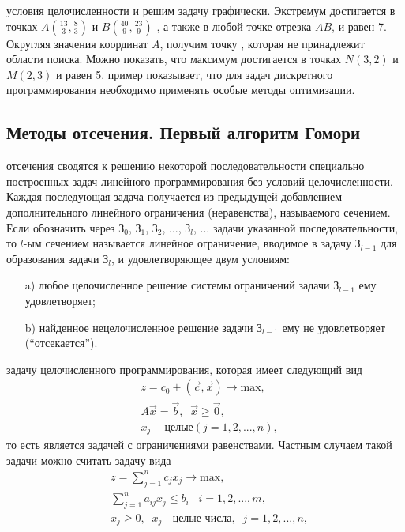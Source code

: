  условия целочисленности и решим задачу графически. Экстремум достигается в точках $A \left(\frac{13}{3},\frac{8}{3}\right)$ и $B \left(\frac{40}{9},\frac{23}{9}\right)$ , а также в любой точке отрезка $AB$, и  равен 7. Округляя  значения  координат $A$, получим точку  , которая не принадлежит области поиска. Можно показать, что максимум достигается в точках $N(3,2)$ и $M(2,3)$ и равен 5.
 пример показывает, что для задач дискретного программирования необходимо применять особые методы оптимизации.
\subsection{Методы отсечения. Первый алгоритм Гомори}
 отсечения сводятся к решению некоторой последовательности специально построенных задач линейного программирования без условий целочисленности. Каждая последующая задача получается из предыдущей добавлением дополнительного линейного ограничения (неравенства), называемого сечением. Если обозначить через З$_0$, З$_1$, З$_2$, ..., З$_l$, ... задачи указанной последовательности, то $l$-ым сечением называется линейное ограничение, вводимое в задачу З$_{l-1}$ для образования задачи З$_l$, и удовлетворяющее двум условиям:
\begin{enumerate}
\item[a)] любое целочисленное решение системы ограничений задачи З$_{l-1}$ ему удовлетворяет;
\item[b)] найденное нецелочисленное решение задачи З$_{l-1}$ ему не удовлетворяет (“отсекается”).
\end{enumerate}
 задачу целочисленного программирования, которая имеет следующий вид
\begin{equation}
\label{equation_5_2}
\begin{split}
	&z = c_0 + (\vec c, \vec x) \rightarrow \textrm{max},\\
	&A\vec x = \vec b,\;\; \vec x \geq \vec 0,\\
	&x_j - \textit{целые} (j = 1,2,...,n),
\end{split}
\tag{$P_1$}
\end{equation}
то есть является задачей с ограничениями равенствами. Частным случаем такой задачи можно считать задачу вида
\begin{equation}
\label{equation_5_3}
\begin{split}
	&z = \sum_{j=1}^n c_jx_j \rightarrow \textrm{max},\\
	&\sum_{j=1}^n a_{ij}x_j \leq b_i \;\;\; i = 1,2,...,m,\\
	&x_j \geq 0,\;\; x_j\;\textrm{- целые числа},\;\; j = 1,2,...,n,
\end{split}
\tag{$P_2$}
\end{equation}
